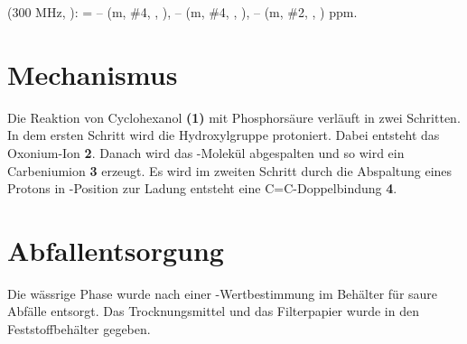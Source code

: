 \documentclass[12pt]{article}
\begin{document}
\begin{onehalfspace}
\begin{experimental}[format=\bfseries,delta=(ppm),list=true,use-equal,pos-number = side]

\begin{minipage}[b]{0.90\textwidth} 

\NMR* (300 \si{\MHz}, ): \chemdelta = --  (m, \#{4}, , ), --  (m, \#{4}, , ), -- (m, \#{2}, , ) ppm.
  \end{minipage}
  \hfill
\begin{minipage}[t][][b]{0.10\textwidth} 

  \end{minipage}
\end{experimental}



\section{Mechanismus\cite{bio}} 
Die Reaktion von Cyclohexanol \textbf{(1)} mit Phosphorsäure verläuft in zwei Schritten. In dem ersten Schritt wird die Hydroxylgruppe protoniert. Dabei entsteht das Oxonium-Ion \textbf{2}. Danach wird das -Molekül abgespalten und so wird ein Carbeniumion \textbf{3} erzeugt. Es wird im zweiten Schritt durch die Abspaltung eines Protons in \alpha-Position zur Ladung entsteht eine C=C-Doppelbindung \textbf{4}. 
     
\section{Abfallentsorgung}

Die wässrige Phase wurde nach einer \pH-Wertbestimmung im Behälter für saure Abfälle entsorgt.  Das Trocknungsmittel und das Filterpapier wurde in den Feststoffbehälter gegeben. 


\end{onehalfspace}
\end{document}
